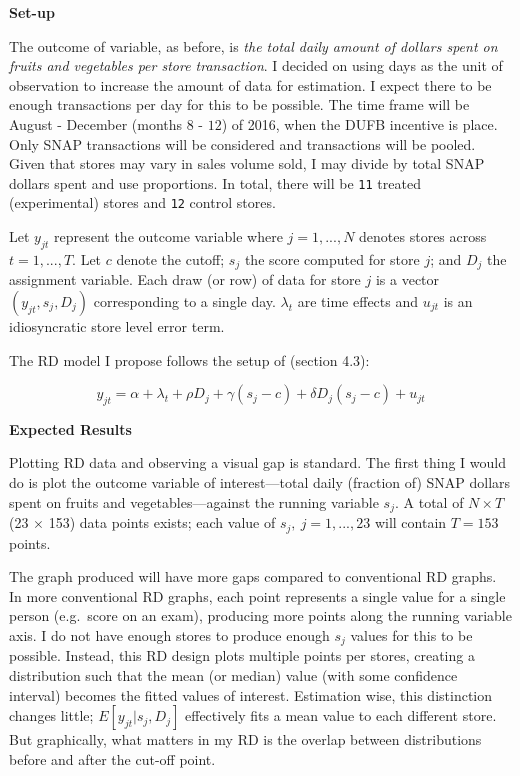 \documentclass[12pt,letterpaperpaper,]{book}
\begin{document}
\textbf{Set-up}

The outcome of variable, as before, is \emph{the total daily amount of
dollars spent on fruits and vegetables per store transaction}. I decided
on using days as the unit of observation to increase the amount of data
for estimation. I expect there to be enough transactions per day for
this to be possible. The time frame will be August - December (months
\(8\) - \(12\)) of 2016, when the DUFB incentive is place. Only SNAP
transactions will be considered and transactions will be pooled. Given
that stores may vary in sales volume sold, I may divide by total SNAP
dollars spent and use proportions. In total, there will be \texttt{11}
treated (experimental) stores and \texttt{12} control stores.

Let \(y_{jt}\) represent the outcome variable where \(j=1,...,N\)
denotes stores across \(t=1,...,T\). Let \(c\) denote the cutoff;
\(s_{j}\) the score computed for store \(j\); and \(D_{j}\) the
assignment variable. Each draw (or row) of data for store \(j\) is a
vector \((y_{jt}, s_{j}, D_{j})\) corresponding to a single day.
\(\lambda_t\) are time effects and \(u_{jt}\) is an idiosyncratic store
level error term.

The RD model I propose follows the setup of \citet{lee_regression_2010}
(section 4.3):

\[y_{jt} = \alpha + \lambda_t + \rho D_{j} + \gamma (s_{j} - c) + \delta D_{j}(s_{j} - c) + u_{jt}\]

\textbf{Expected Results}

Plotting RD data and observing a visual gap is standard. The first thing
I would do is plot the outcome variable of interest---total daily
(fraction of) SNAP dollars spent on fruits and vegetables---against the
running variable \(s_j\). A total of \(N \times T\) (23 \(\times\) 153)
data points exists; each value of \(s_j,~j=1,...,23\) will contain
\(T=153\) points.

The graph produced will have more gaps compared to conventional RD
graphs. In more conventional RD graphs, each point represents a single
value for a single person (e.g.~score on an exam), producing more points
along the running variable axis. I do not have enough stores to produce
enough \(s_j\) values for this to be possible. Instead, this RD design
plots multiple points per stores, creating a distribution such that the
mean (or median) value (with some confidence interval) becomes the
fitted values of interest. Estimation wise, this distinction changes
little; \(E[y_{jt}|s_{j}, D_{j}]\) effectively fits a mean value to each
different store. But graphically, what matters in my RD is the overlap
between distributions before and after the cut-off point.
\end{document}
